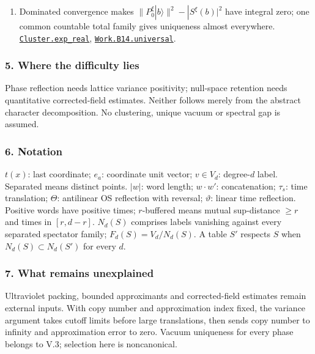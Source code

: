 \documentclass[
  letterpaper,
  11pt]{article}
\begin{document}
\begin{enumerate}
  \href{https://github.com/yang-mills-group/OpenAI-YM-20261028/blob/3456e5e75cf8d4cd558955a5c7638fba2d68f464/YM/Phase/Picks.lean\#L128-L158}{\texttt{Retain.lift\_detect}}.
\item
  Dominated convergence makes \(\|P_0^\xi|b\rangle\|^2-|S^\xi(b)|^2\)
  have integral zero; one common countable total family gives uniqueness
  almost everywhere.
  \href{https://github.com/yang-mills-group/OpenAI-YM-20261028/blob/3456e5e75cf8d4cd558955a5c7638fba2d68f464/YM/Phase/Unique.lean\#L56-L86}{\texttt{Cluster.exp\_real}},
  \href{https://github.com/yang-mills-group/OpenAI-YM-20261028/blob/3456e5e75cf8d4cd558955a5c7638fba2d68f464/YM/Work/B14.lean\#L119-L143}{\texttt{Work.B14.universal}}.
\end{enumerate}

\subsubsection{5. Where the difficulty
lies}\label{where-the-difficulty-lies-20}

Phase reflection needs lattice variance positivity; null-space retention
needs quantitative corrected-field estimates. Neither follows merely
from the abstract character decomposition. No clustering, unique vacuum
or spectral gap is assumed.

\subsubsection{6. Notation}\label{notation-20}

\(t(x)\): last coordinate; \(e_a\): coordinate unit vector;
\(v\in V_d\): degree-\(d\) label. Separated means distinct points.
\(|w|\): word length; \(w\cdot w'\): concatenation; \(\tau_s\): time
translation; \(\Theta\): antilinear OS reflection with reversal;
\(\vartheta\): linear time reflection. Positive words have positive
times; \(r\)-buffered means mutual sup-distance \(\ge r\) and times in
\([r,d-r]\). \(N_d(S)\) comprises labels vanishing against every
separated spectator family; \(F_d(S)=V_d/N_d(S)\). A table \(S'\)
respects \(S\) when \(N_d(S)\subset N_d(S')\) for every \(d\).

\subsubsection{7. What remains
unexplained}\label{what-remains-unexplained-20}

Ultraviolet packing, bounded approximants and corrected-field estimates
remain external inputs. With copy number and approximation index fixed,
the variance argument takes cutoff limits before large translations,
then sends copy number to infinity and approximation error to zero.
Vacuum uniqueness for every phase belongs to V.3; selection here is
noncanonical.
\end{document}
